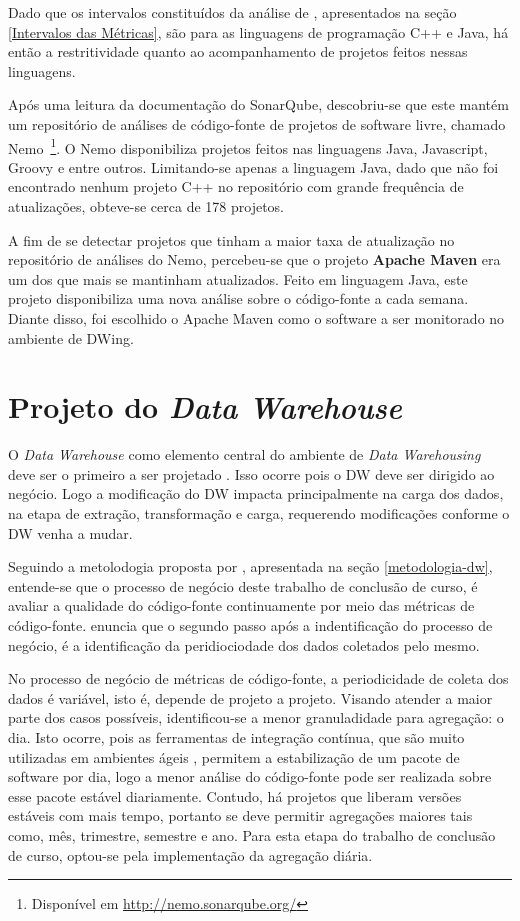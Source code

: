 Dado que os intervalos constituídos da análise de , apresentados na seção \ref{Intervalos das Métricas}, são para as linguagens de programação C++ e Java, há então a restritividade quanto ao acompanhamento de projetos feitos nessas linguagens.

Após uma leitura da documentação do SonarQube, descobriu-se que este mantém um repositório de análises de código-fonte de projetos de software livre, chamado Nemo~\footnote{Disponível em \url{http://nemo.sonarqube.org/}}. O Nemo disponibiliza projetos feitos nas linguagens Java, Javascript, Groovy e entre outros. Limitando-se apenas a linguagem Java, dado que não foi encontrado nenhum projeto C++ no repositório com grande frequência de atualizações, obteve-se cerca de 178 projetos.

A fim de se detectar projetos que tinham a maior taxa de atualização no repositório de análises do Nemo, percebeu-se que o projeto \textbf{Apache Maven} era um dos que mais se mantinham atualizados. Feito em linguagem Java, este projeto disponibiliza uma nova análise sobre o código-fonte a cada semana. Diante disso, foi escolhido o Apache Maven como o software a ser monitorado no ambiente de DWing. 




\section{Projeto do \textit{Data Warehouse}}

O \textit{Data Warehouse} como elemento central do ambiente de \textit{Data Warehousing} deve ser o primeiro a ser projetado \cite{Kimball2002}. Isso ocorre pois o DW deve ser dirigido ao negócio. Logo a modificação do DW impacta principalmente na carga dos dados, na etapa de extração, transformação e carga, requerendo modificações conforme o DW venha a mudar.

Seguindo a metolodogia proposta por , apresentada na seção \ref{metodologia-dw}, entende-se que o processo de negócio deste trabalho de conclusão de curso, é avaliar a qualidade do código-fonte continuamente por meio das métricas de código-fonte.  enuncia que o segundo passo após a indentificação do processo de negócio, é a identificação da peridiociodade dos dados coletados pelo mesmo.


No processo de negócio de métricas de código-fonte, a periodicidade de coleta dos dados é variável, isto é, depende de projeto a projeto. Visando atender a maior parte dos casos possíveis, identificou-se a menor granuladidade para agregação: o dia. Isto ocorre, pois as ferramentas de integração contínua, que são muito utilizadas em ambientes ágeis \cite{beckarticle1999}, permitem a estabilização de um pacote de software por dia, logo a menor análise do código-fonte pode ser realizada sobre esse pacote estável diariamente. Contudo, há projetos que liberam versões estáveis com mais tempo, portanto se deve permitir agregações maiores tais como, mês, trimestre, semestre e ano. Para esta etapa do trabalho de conclusão de curso, optou-se pela implementação da agregação diária.


